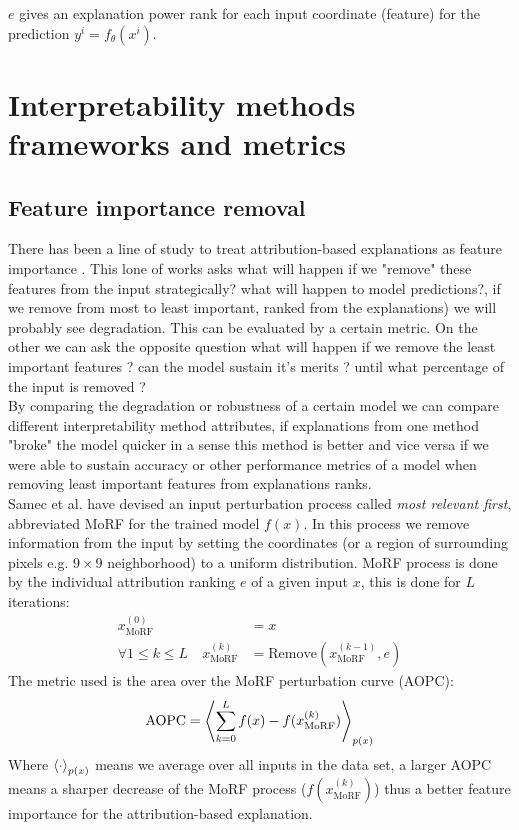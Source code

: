 \documentclass[12pt]{report}
\begin{document}
$e$ gives an explanation power rank for each input coordinate (feature) for the prediction $y^i=f_{\theta}(x^i)$.


\section{Interpretability methods frameworks and metrics}

\subsection{Feature importance removal}

There has been a line of study to treat attribution-based explanations as feature importance \cite{https://doi.org/10.48550/arxiv.1509.06321} \cite{https://doi.org/10.48550/arxiv.1806.10758}.  This lone of works asks what will happen if we "remove" these features from the input strategically?  what will happen to model predictions?, if we remove from most to least important, ranked from the explanations) we will probably see degradation. This can be evaluated by a certain metric. On the other we can ask the opposite question what will happen if we remove the least important features ? can the model sustain it's merits ? until what percentage of the input is removed ? \\

By comparing the degradation or robustness of a certain model we can compare different interpretability method attributes, if explanations from one method "broke" the model quicker in a sense this method is better and vice versa if we were able to sustain accuracy or other performance metrics of a model when removing least important features from explanations ranks.\\

Samec et al. \cite{https://doi.org/10.48550/arxiv.1509.06321} have devised an input perturbation process called \textit{most relevant first}, abbreviated MoRF for the trained model $f(x)$. In this process we remove information from the input by setting the coordinates (or a region of surrounding pixels e.g. $9 \times 9$ neighborhood) to a uniform distribution. MoRF process is done by the individual attribution ranking $e$ of a given input $x$, this is done for $L$ iterations:
\begin{align*}
	x_{\text{MoRF}}^{(0)} & = x  \\ 
	\forall 1 \le k \le L \quad x_{\text{MoRF}}^{(k)} &= \text{Remove} (x_{\text{MoRF}}^{(k-1)}, e)	
\end{align*}
The metric used is the area over the MoRF perturbation curve (AOPC):
\begin{align*}
	\text{AOPC} = \Braket{	\sum_{k=0}^{L}f(x) -f(x_{\text{MoRF}}^{(k)})}_{p(x)}
\end{align*}
Where $\Braket{\cdot}_{p(x)}$ means we average over all inputs in the data set, a larger AOPC means a sharper decrease of the MoRF process ($f(x_{\text{MoRF}}^{(k)})$) thus a better feature importance for the attribution-based explanation. \\
\end{document}
